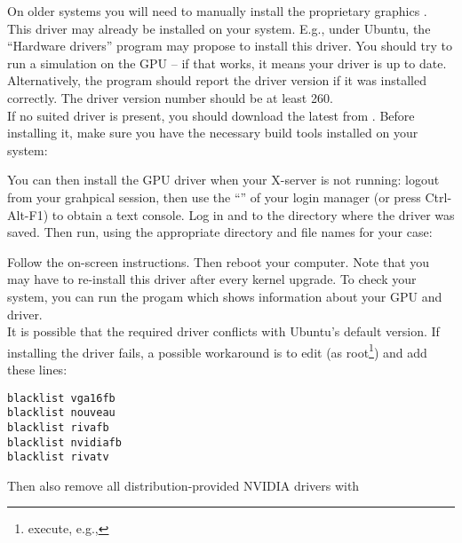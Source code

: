 On older systems you will need to manually install the proprietary \nvidia graphics . This driver may already be installed on your system. E.g., under Ubuntu, the ``Hardware drivers'' program may propose to install this driver. You should try to run a simulation on the GPU -- if that works, it means your driver is up to date. Alternatively, the program  should report the driver version if it was installed correctly. The driver version number should be at least 260.\\

If no suited driver is present, you should download the latest  from \nvidia. Before installing it, make sure you have the necessary build tools installed on your system:


You can then install the GPU driver when your X-server is not running: logout from your grahpical session, then use the ``'' of your login manager (or press Ctrl-Alt-F1) to obtain a text console. Log in and  to the directory where the driver was saved. Then run, using the appropriate directory and file names for your case:


Follow the on-screen instructions. Then reboot your computer. Note that you may have to re-install this driver after every kernel upgrade. To check your system, you can run the progam  which shows information about your GPU and driver.\\

It is possible that the required driver conflicts with Ubuntu's default version. If installing the driver fails, a possible workaround is to edit  (as root\footnote{execute, e.g., }) and add these lines:
\small
\begin{verbatim}
blacklist vga16fb
blacklist nouveau
blacklist rivafb
blacklist nvidiafb
blacklist rivatv
\end{verbatim}
\normalsize

Then also remove all distribution-provided \textsc{NVIDIA} drivers with


